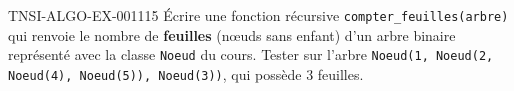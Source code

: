 \begin{exercice}{TNSI-ALGO-EX-001}{1}{15}
Écrire une fonction récursive \lstinline{compter_feuilles(arbre)} qui renvoie le nombre de \textbf{feuilles} (nœuds sans enfant) d'un arbre binaire représenté avec la classe \lstinline{Noeud} du cours. Tester sur l'arbre \lstinline{Noeud(1, Noeud(2, Noeud(4), Noeud(5)), Noeud(3))}, qui possède 3 feuilles.
\end{exercice}
